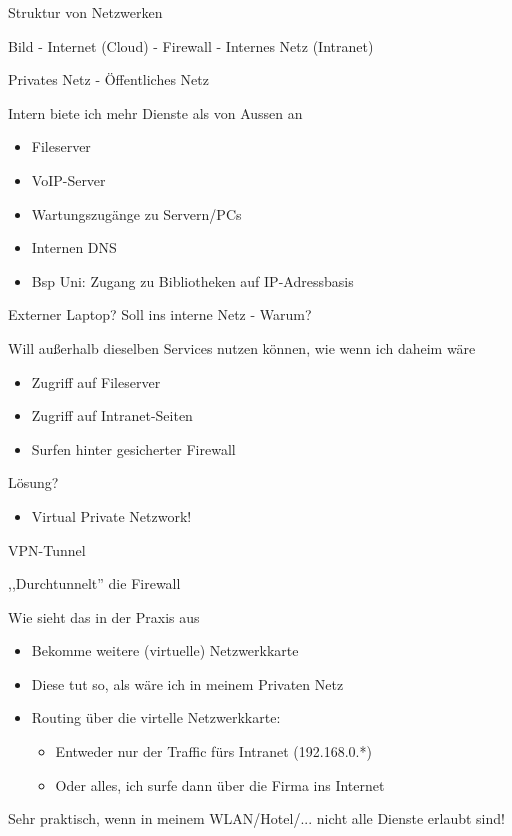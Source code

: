 \documentclass{beamer}
\begin{document}
\begin{frame}{Struktur von Netzwerken}

	
	Bild - Internet (Cloud) - Firewall - Internes Netz (Intranet)

\end{frame}




\begin{frame}{Privates Netz - Öffentliches Netz}

Intern biete ich mehr Dienste als von Aussen an

\begin{itemize}
  \item Fileserver
  \item VoIP-Server
  \item Wartungszugänge zu Servern/PCs
  \item Internen DNS
  \item Bsp Uni: Zugang zu Bibliotheken auf IP-Adressbasis
\end{itemize}
\end{frame}

\begin{frame}{Externer Laptop?}
	Soll ins interne Netz - Warum?

	Will außerhalb dieselben Services nutzen können, wie wenn ich daheim wäre
\begin{itemize}
  \item Zugriff auf Fileserver
  \item Zugriff auf Intranet-Seiten
  \item Surfen hinter gesicherter Firewall
\end{itemize}
\pause
Lösung?
  \begin{itemize}
    \item Virtual Private Netzwork!
  \end{itemize}
\end{frame}

\begin{frame}{VPN-Tunnel}

	,,Durchtunnelt'' die Firewall

	\pause

	Wie sieht das in der Praxis aus

\begin{itemize}
	\item Bekomme weitere (virtuelle) Netzwerkkarte
	\item Diese tut so, als wäre ich in meinem Privaten Netz
		\pause
	\item Routing über die virtelle Netzwerkkarte:
  \begin{itemize}
	  \item Entweder nur der Traffic fürs Intranet (192.168.0.*)
	  \item Oder alles, ich surfe dann über die Firma ins Internet
  \end{itemize}
\end{itemize}
  \pause
    Sehr praktisch, wenn in meinem WLAN/Hotel/... nicht alle Dienste erlaubt sind!
\end{frame}
\end{document}
